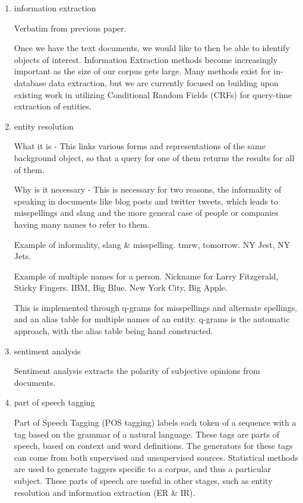 \documentclass{article}
\begin{document}
\begin{enumerate}
\begin{enumerate}
    \begin{enumerate}
    \item information extraction

      Verbatim from previous paper.

      Once we have the text documents, we would like to then be able to identify
      objects of interest. Information Extraction methods become increasingly
      important as the size of our corpus gets large. Many methods exist for in-database data
      extraction, but we are currently focused on building upon existing work in
      utilizing Conditional Random Fields (CRFs) for query-time extraction of
      entities.

    \item entity resolution

      What it is -
      This links various forms and representations of the same background object,
      so that a query for one of them returns the results for all of them.

      Why is it necessary -
      This is necessary for two reasons,
      the informality of speaking in documents like blog posts and twitter tweets,
      which leads to misspellings and slang
      and the more  general case of people or companies having many names to refer to them.

      Example of informality, slang \& misspelling. tmrw, tomorrow. NY Jest, NY Jets.

      Example of multiple names for a person. Nickname for Larry Fitzgerald, Sticky Fingers. IBM, Big Blue. New York City, Big Apple.

      This is implemented through q-grams for misspellings and alternate spellings, and an alias table for multiple names of an entity.
      q-grams is the automatic approach, with the alias table being hand constructed.

    \item sentiment analysis

      Sentiment analysis extracts the polarity of subjective opinions from documents.

    \item part of speech tagging

      Part of Speech Tagging (POS tagging) labels each token of a sequence with a tag based on the grammar of a natural language.
      These tags are parts of speech, based on context and word definitions.
      The generators for these tags can come from both supervised and unsupervised sources.
      Statistical methods are used to generate taggers specific to a corpus, and thus a particular subject.
      These parts of speech are useful in other stages, such as entity resolution and information extraction (ER \& IR).


\end{enumerate}
\end{enumerate}
\end{enumerate}
\end{document}
